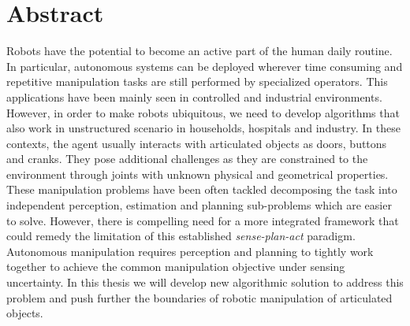 \section*{Abstract}

Robots have the potential to become an active part of the human daily routine. In particular, autonomous systems can be deployed wherever time consuming and repetitive manipulation tasks are still performed by specialized operators. This applications have been mainly seen in controlled and industrial environments. However, in order to make robots ubiquitous, we need to develop algorithms that also work in unstructured scenario in households, hospitals and industry. In these contexts, the agent usually interacts with articulated objects as doors, buttons and cranks. They pose additional challenges as they are constrained to the environment through joints with unknown physical and geometrical properties. These manipulation problems have been often tackled decomposing the task into independent perception, estimation and planning sub-problems which are easier to solve. However, there is compelling need for a more integrated framework that could remedy the limitation of this established \emph{sense-plan-act} paradigm. Autonomous manipulation requires perception and planning to tightly work together to achieve the common manipulation objective under sensing uncertainty. In this thesis we will develop new algorithmic solution to address this problem and push further the boundaries of robotic manipulation of articulated objects.  
